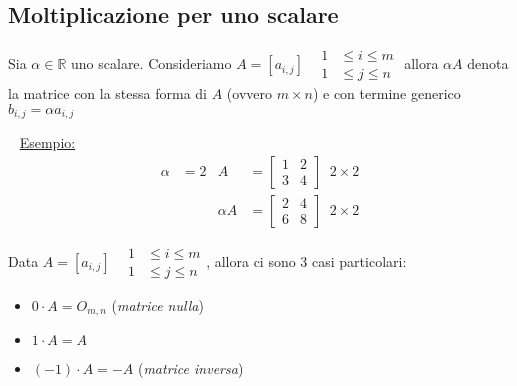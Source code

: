 \documentclass[12pt,oneside]{book}
\begin{document}
\subsection{Moltiplicazione per uno scalare}
Sia $\alpha \in \mathbb{R}$ uno scalare.
Consideriamo $A=[a_{i,j}]\;\;\; \begin{aligned} 1&\le i\le m\\ 1&\le j\le n \end{aligned}$
allora $\alpha A$ denota la matrice con la stessa forma di $A$ (ovvero $m \times n$) e con
termine generico $b_{i,j} = \alpha a_{i,j}$

~\newline
\underline{Esempio:}
\begin{align*}
    \alpha   & = 2                                          & A & = \begin{bmatrix}
        1 & 2 \\
        3 & 4
    \end{bmatrix} \;\; 2 \times 2 \\
             &                                              &
    \alpha A & = \begin{bmatrix}
        2 & 4 \\
        6 & 8
    \end{bmatrix} \;\; 2 \times 2
\end{align*}

\noindent Data $A=[a_{i,j}]\;\;\; \begin{aligned} 1&\le i\le m\\ 1&\le j\le n \end{aligned}$, allora ci sono 3 casi particolari:
\begin{itemize}
    \item $0 \cdot A = O_{m,n}$ (\emph{matrice nulla})
    \item $1 \cdot A = A$
    \item $(-1) \cdot A = -A$ (\emph{matrice inversa})
\end{itemize}
\end{document}
